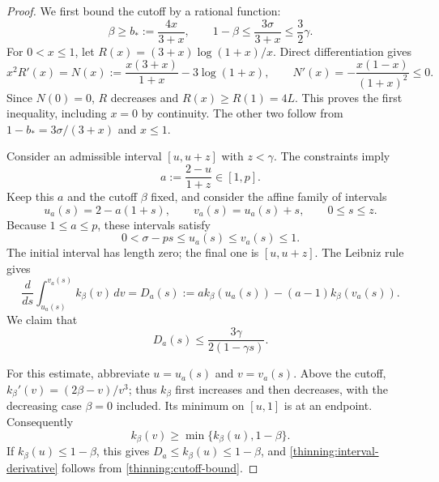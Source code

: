 \begin{proof}
We first bound the cutoff by a rational function:
\begin{equation}
\label{thinning:cutoff-bound}
 \beta\ge b_*:=\frac{4x}{3+x},\qquad
 1-\beta\le\frac{3\sigma}{3+x}\le\frac32\gamma.
\end{equation}
For $0<x\le1$, let $R(x)=(3+x)\log(1+x)/x$.  Direct
differentiation gives
\[
 x^2R'(x)=N(x):=\frac{x(3+x)}{1+x}-3\log(1+x),
 \qquad N'(x)=-\frac{x(1-x)}{(1+x)^2}\le0.
\]
Since $N(0)=0$, $R$ decreases and $R(x)\ge R(1)=4L$.
This proves the first inequality, including $x=0$ by continuity.
The other two follow from $1-b_*=3\sigma/(3+x)$ and $x\le1$.

Consider an admissible interval $[u,u+z]$ with $z<\gamma$.
The constraints imply
\[
 a:=\frac{2-u}{1+z}\in[1,p].
\]
Keep this $a$ and the cutoff $\beta$ fixed, and consider the affine
family of intervals
\begin{equation}
\label{thinning:affine-intervals}
 u_a(s)=2-a(1+s),\qquad v_a(s)=u_a(s)+s,
 \qquad 0\le s\le z.
\end{equation}
Because $1\le a\le p$, these intervals satisfy
\[
 0<\sigma-ps\le u_a(s)\le v_a(s)\le1.
\]
The initial interval has length zero; the final one is $[u,u+z]$.
The Leibniz rule gives
\[
 \frac{d}{ds}\int_{u_a(s)}^{v_a(s)}k_\beta(v)\,dv
 =D_a(s):=a k_\beta(u_a(s))-(a-1)k_\beta(v_a(s)).
\]
We claim that
\begin{equation}
\label{thinning:interval-derivative}
 D_a(s)\le\frac{3\gamma}{2(1-\gamma s)}.
\end{equation}

For this estimate, abbreviate $u=u_a(s)$ and $v=v_a(s)$.
Above the cutoff,
$k_\beta'(v)=(2\beta-v)/v^3$; thus $k_\beta$ first increases
and then decreases, with the decreasing case $\beta=0$ included.
Its minimum on $[u,1]$ is at an endpoint.  Consequently
\[
 k_\beta(v)\ge\min\{k_\beta(u),1-\beta\}.
\]
If $k_\beta(u)\le1-\beta$, this gives
$D_a\le k_\beta(u)\le1-\beta$, and
\eqref{thinning:interval-derivative} follows from
\eqref{thinning:cutoff-bound}.


\end{proof}
